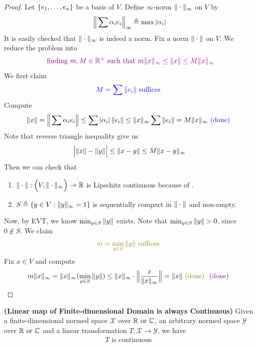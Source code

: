 \documentclass{report}
\begin{document}
\begin{proof}
Let $\{ e_1,\dots ,e_n \}$ be a basis of $V$. Define $\infty$-norm $\| \cdot \|_\infty$ on $V$ by 
\begin{align*}
\Big\| \sum \alpha_i e_i \Big\|_{\infty}\triangleq  \max \left|\alpha_i\right| 
\end{align*}
It is easily checked that $\| \cdot \|_\infty$ is indeed a norm. Fix a norm $\| \cdot \|$ on $V$. We reduce the problem into  
\begin{align*}
  \textcolor{violet}{\text{ finding $m,M\in\mathbb{R}^+$ such that }m\| x \|_\infty \leq \| x \|\leq M\| x \|_\infty}
\end{align*}
We first claim 
\begin{align*}
\textcolor{blue}{M=\sum \| e_i \|\text{ suffices }}
\end{align*}
Compute 
\begin{align*}
\| x \|= \Big\| \sum \alpha_ie_i \Big\| \leq \sum \left|\alpha _i\right| \| e_i \| \leq \| x \|_\infty \sum \| e_i \|= M \| x \|_\infty \textcolor{blue}{\text{ (done) }}
\end{align*}
Note that reverse triangle inequality give us 
\begin{align}
\label{Lip1}
\Big|\| x \|-\| y \|\Big|\leq \| x-y \| \leq M \| x-y \|_\infty
\end{align}
Then we can check that 
\begin{enumerate}[label=(\alph*)]
  \item  $\| \cdot \|:\Big(V,\| \cdot \|_\infty \Big)\rightarrow \mathbb{R}$ is Lipschitz continuous because of .
  \item $S\triangleq \{ y\in V:\| y \|_\infty=1 \}$ is sequentially compact in $\| \cdot \|$ and non-empty. 
\end{enumerate}
Now, by EVT, we know $\min _{y \in S}\| y \|$ exists. Note that $\min_{y \in S}\norm{y}>0$, since $0 \not\in S$. We claim 
\begin{align*}
  \olive{m= \min_{y \in S}\norm{y}\text{ suffices }}
\end{align*}
Fix $x \in V$ and compute 
\begin{align*}
m\norm{x}_\infty = \norm{x}_\infty (\min_{y \in S} \norm{y})\leq \norm{x}_\infty \cdot  \bnorm{ \frac{x}{\norm{x}_\infty}}=\norm{x}\odone \vdone
\end{align*}






\end{proof}
\begin{theorem}
\label{LmoF}
\textbf{(Linear map of Finite-dimensional Domain is always Continuous)} Given a finite-dimensional normed space $\mathcal{X}$ over $\mathbb{R}\text{ or }\mathbb{C}$, an arbitrary normed space  $\mathcal{Y}$ over $\mathbb{R}\text{ or }\mathbb{C}$ and a linear transformation  $T:\mathcal{X}\rightarrow \mathcal{Y}$, we have 
\begin{align*}
T\text{ is continuous }
\end{align*}
\end{theorem}
\end{document}
